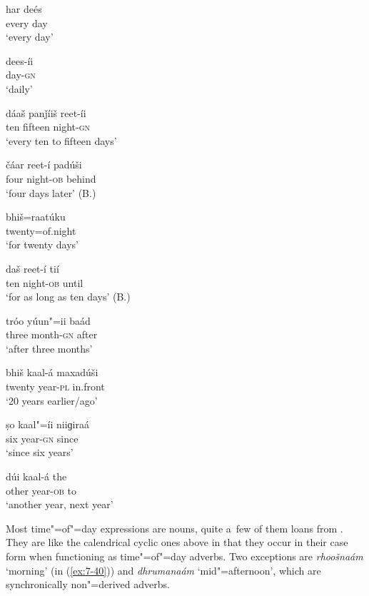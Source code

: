 \begin{exe}
\ex
\label{ex:7-30}
\gll har deés  \\
every day \\
\glt `every day' 

\ex
\label{ex:7-31}
\gll dees-íi \\
day-\textsc{gn} \\
\glt `daily' 

\ex
\label{ex:7-32}
\gll dáaš panǰíiš reet-íi \\
ten fifteen night-\textsc{gn} \\
\glt `every ten to fifteen days'

\ex
\label{ex:7-33}
\gll čáar reet-í padúši \\
four night-\textsc{ob} behind  \\
\glt `four days later' (B.)

\ex
\label{ex:7-34}
\gll bhiš=raatúku\\
twenty=of.night    \\
\glt `for twenty days'

\ex
\label{ex:7-35}
\gll daš reet-í tií \\
ten night-\textsc{ob} until  \\
\glt `for as long as ten days' (B.)

\ex
\label{ex:7-36}
\gll tróo yúun"=ii baád \\
three month-\textsc{gn} after \\
\glt `after three months'

\ex
\label{ex:7-37}
\gll bhiš kaal-á maxadúši \\
twenty year-\textsc{pl} in.front  \\
\glt `20 years earlier/ago'

\ex
\label{ex:7-38}
\gll ṣo kaal"=íi niiɡiraá \\
six year-\textsc{gn} since  \\
\glt `since six years'

\ex
\label{ex:7-39}
\gll dúi kaal-á the \\
other year-\textsc{ob} to \\
\glt `another year, next year'
\end{exe}

Most time"=of"=day expressions are nouns, quite a~few of them loans from . They are like the
calendrical cyclic ones above in that they occur in their  case form when functioning as
time"=of"=day adverbs. Two exceptions are \textit{rhoošnaám} `morning' (in (\ref{ex:7-40})) and
\textit{dhrumanaám} `mid"=afternoon', which are synchronically non"=derived adverbs.


